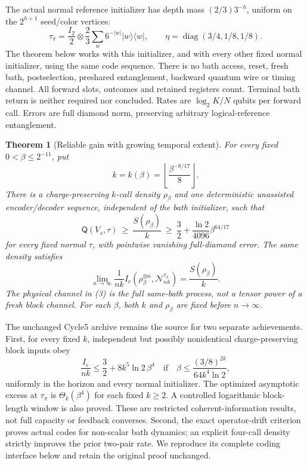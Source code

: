 \documentclass[11pt]{article}
\newtheorem{theorem}{Theorem}[section]
\newcommand{\ket}[1]{\lvert #1\rangle}
\newcommand{\bra}[1]{\langle #1\rvert}
\newcommand{\Ic}{I_{\mathrm c}}
\newcommand{\Qcap}{\mathsf Q}
\begin{document}
The actual normal reference initializer has depth mass
$(2/3)3^{-h}$, uniform on the $2^{h+1}$ seed/color vertices:
\[
 \tau_\pi=\frac{I_2}{2}\otimes\frac23\sum_w6^{-|w|}\ket w\bra w,
 \qquad \eta=\operatorname{diag}(3/4,1/8,1/8).
\]
The theorem below works with this initializer, and with every other
fixed normal initializer, using the same code sequence. There is no bath
access, reset, fresh bath, postselection, preshared entanglement, backward
quantum wire or timing channel. All forward slots, outcomes and retained
registers count. Terminal bath return is neither required nor concluded.
Rates are $\log_2 K/N$ qubits per forward call. Errors are full diamond
norm, preserving arbitrary logical-reference entanglement.

\begin{theorem}[Reliable gain with growing temporal extent]\label{thm:main}
For every fixed $0<\beta\le2^{-11}$, put
\[
 k=k(\beta)=\left\lfloor\frac{\beta^{-8/17}}8\right\rfloor.
 \tag{1}
\]
There is a charge-preserving $k$-call density $\rho_\beta$ and one
deterministic unassisted encoder/decoder sequence, independent of the bath
initializer, such that
\[
 \Qcap(V_s,\tau)\ \ge\ \frac{S(\rho_\beta)}k
 \ \ge\ \frac32+\frac{\ln2}{4096}\beta^{64/17}
 \tag{2}
\]
for every fixed normal $\tau$, with pointwise vanishing full-diamond
error. The same density satisfies
\[
 \lim_{n\to\infty}\frac1{nk}
 \Ic(\rho_\beta^{\otimes n},\mathcal N_{nk}^{\tau_\pi})
 =\frac{S(\rho_\beta)}k.
 \tag{3}
\]
The physical channel in (3) is the full same-bath process, not a tensor
power of a fresh block channel. For each $\beta$, both $k$ and
$\rho_\beta$ are fixed before $n\to\infty$.
\end{theorem}

The unchanged Cycle5 archive \cite{Cycle5} remains the source for two
separate achievements. First, for every fixed $k$, independent but
possibly nonidentical charge-preserving block inputs obey
\[
 \frac{\Ic}{nk}\le\frac32+8k^5\ln2\,\beta^4
 \quad\text{if}\quad
 \beta\le\frac{(3/8)^{2k}}{64k^4\ln2},
 \tag{4}
\]
uniformly in the horizon and every normal initializer. The optimized
asymptotic excess at $\tau_\pi$ is $\Theta_k(\beta^4)$ for each fixed
$k\ge2$. A controlled logarithmic block-length window is also proved.
These are restricted coherent-information results, not full capacity or
feedback converses. Second, the exact operator-drift criterion proves
actual codes for non-scalar bath dynamics; an explicit four-call density
strictly improves the prior two-pair rate. We reproduce its complete
coding interface below and retain the original proof unchanged.
\end{document}
